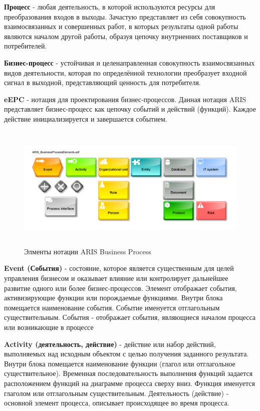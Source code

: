 \textbf{Процесс} - любая деятельность, в которой используются ресурсы для преобразования входов в выходы.
Зачастую представляет из себя совокупность взаимосвязанных и совершенных работ,
в которых результаты одной работы являются началом другой работы,
образуя цепочку внутрненних поставщиков и потребителей.

\textbf{Бизнес-процесс} - устойчивая и целенаправленная совокупность взаимосвязанных видов деятельности,
которая по определённой технологии преобразует входной сигнал в выходной, представляющий ценность для потребителя.

\textbf{eEPC} - нотация для проектирования бизнес-процессов.
Данная нотация ARIS представляет бизнес-процесс как цепочку событий и действий (функций).
Каждое действие инициализируется и завершается событием.

\begin{figure}[!h]
    \centering
  
    \includegraphics[height=6cm]
    {assets/ARIS/ARIS_BusinessProcessElements.adf.pdf}
    
    \caption{Элменты нотации ARIS Business Process}
    
    \label{fig:MBP_Product}
\end{figure}

\textbf{Event (События)} - состояние, которое является существенным для целей управления бизнесом
и оказывает влияние или контролирует дальнейшее развитие одного или более бизнес-процессов.
Элемент отображает события, активизирующие функции или порождаемые функциями.
Внутри блока помещается наименование события.
Событие именуется отглагольным существительным.
События - отображает события, являющиеся началом процесса или возникающие в процессе

\textbf{Activity (деятельность, действие)} - действие или набор действий, выполняемых над исходным объектом с целью получения заданного результата.
Внутри блока помещается наименование функции (глагол или отглагольное существительное).
Временная последовательность выполнения функций задается расположением функций на диаграмме процесса сверху вниз.
Функция именуется глаголом или отглагольным существительным.
Деятельность (действие) - основной элемент процесса, описывает происходящее во время процесса.

